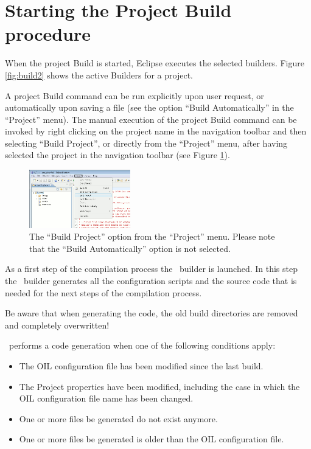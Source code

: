 \section{Starting the Project Build procedure}

When the project Build is started, Eclipse executes the selected
builders. Figure \ref{fig:build2} shows the active Builders for a
project.

A project Build command can be run explicitly upon user request, or
automatically upon saving a file (see the option ``Build
Automatically'' in the ``Project'' menu). The manual execution of the
project Build command can be invoked by right clicking on the project
name in the navigation toolbar and then selecting ``Build Project'',
or directly from the ``Project'' menu, after having selected the
project in the navigation toolbar (see Figure
\ref{fig:buildproc1}).

\begin{figure}
  \begin{center}
    \includegraphics[width=4.4cm, bb=0 0 621 357]{images/buildproc1.png}
  \end{center}
  \caption{The ``Build Project'' option from the ``Project''
  menu. Please note that the ``Build Automatically'' option is not
  selected.}
  \label{fig:buildproc1}
\end{figure}

As a first step of the compilation process the \rtd\ builder is
launched. In this step the \rtd\ builder generates all the configuration 
scripts and the source code that is needed for the next steps of the
compilation process.

\begin{warning}
Be aware that when generating the code, the old build directories are
removed and completely overwritten!
\end{warning}

\rtd\ performs a code generation when one of the following conditions
apply:

\begin{itemize}
\item The OIL configuration file has been modified since the last
  build.
\item The Project properties have been modified, including the
  case in which the OIL configuration file name has been changed.
\item One or more files be generated do not exist anymore.
\item One or more files be generated is older than the OIL
configuration file.
\end{itemize}

